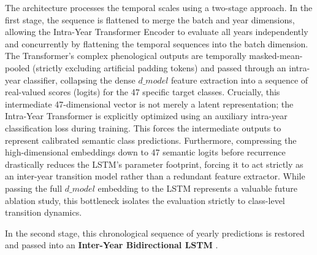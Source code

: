 The architecture processes the temporal scales using a two-stage approach.
In the first stage, the sequence is flattened to merge the batch and year dimensions,
allowing the Intra-Year Transformer Encoder to evaluate all years independently and concurrently by flattening the temporal sequences into the batch dimension.
The Transformer's complex phenological outputs are temporally masked-mean-pooled
(strictly excluding artificial padding tokens) and passed through an intra-year classifier,
collapsing the dense $d\_model$ feature extraction into a sequence of real-valued scores (logits) for the 47 specific target classes.
Crucially, this intermediate 47-dimensional vector is not merely a latent representation;
the Intra-Year Transformer is explicitly optimized using an auxiliary intra-year classification loss during training.
This forces the intermediate outputs to represent calibrated semantic class predictions.
Furthermore, compressing the high-dimensional embeddings down to 47 semantic logits before recurrence drastically
reduces the LSTM's parameter footprint, forcing it to act strictly as an inter-year transition model rather than a redundant feature extractor.
While passing the full $d\_model$ embedding to the LSTM represents a valuable future ablation study,
this bottleneck isolates the evaluation strictly to class-level transition dynamics.

In the second stage, this chronological sequence of yearly predictions is restored and passed into an \textbf{Inter-Year Bidirectional LSTM} \cite{hochreiter_long_1997}. 

